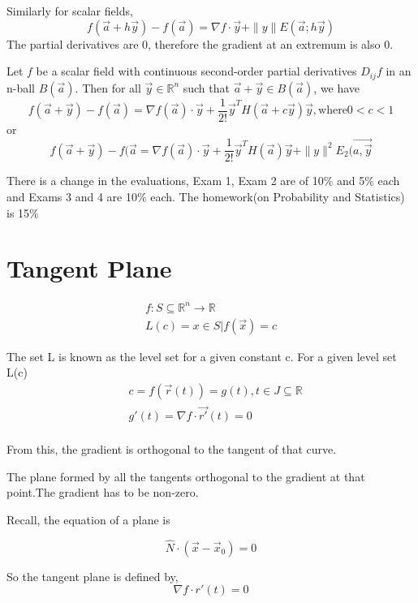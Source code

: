 \documentclass[twoside]{report}
\begin{document}
Similarly for scalar fields, 
\[ 
	f(\vec{a} + h\vec{y}) - f(\vec{a}) = \nabla f \cdot \vec{y} + \|y\|E(\vec{a};h\vec{y})
\]
The partial derivatives are 0, therefore the gradient at an extremum is also 0.
\begin{theorem}
	Let $f$ be a scalar field with continuous second-order partial derivatives $D_{ij}f$ in an n-ball $B(\vec{a})$. Then for all $\vec{y} \in \mathbb{R}^n$ such that $\vec{a} + \vec{y} \in B(\vec{a})$, we have
\[ 
	f(\vec{a} + \vec{y}) - f(\vec{a}) = \nabla f(\vec{a}) \cdot \vec{y} + \frac{1}{2!} \vec{y}^T H(\vec{a} + c \vec{y})\vec{y}, \text{where} 0 < c< 1
\] 
or 
\[
	f(\vec{a} + \vec{y}) - f(\vec{a} = \nabla f(\vec{a})\cdot \vec{y} + \frac{1}{2!} \vec{y}^T H(\vec{a}) \vec{y} + \|y \|^2 E_2(\vec{a,\vec{y}}
\]
\end{theorem}
\begin{note}
	There is a change in the evaluations, Exam 1, Exam 2 are of 10\% and 5$\%$ each and Exams 3 and 4 are 10\% each. The homework(on Probability and Statistics) is 15\%
\end{note}

\section{Tangent Plane}
\begin{align*}
	f: S \subseteq \mathbb{R}^n \rightarrow \mathbb{R} \\
	L(c) = {x \in S | f(\vec{x}) = c}
\end{align*}

The set L is known as the level set for a given constant c.
For a given level set L(c)
\begin{align*}
&c = f(\vec{r}(t)) = g(t), t \in J \subseteq \mathbb{R}\\
&g'(t) = \nabla f \cdot \vec{r'}(t) = 0 \\
\end{align*}

From this, the gradient is orthogonal to the tangent of that curve.

\begin{definition}
The plane formed by all the tangents orthogonal to the gradient at that point.The gradient has to be non-zero.
\end{definition}

Recall, the equation of a plane is

\[
	\hat{N} \cdot (\vec{x} - \vec{x}_0) = 0
\]

So the tangent plane is defined by,
\[
	\nabla f \cdot r'(t) = 0
\]
\end{document}
